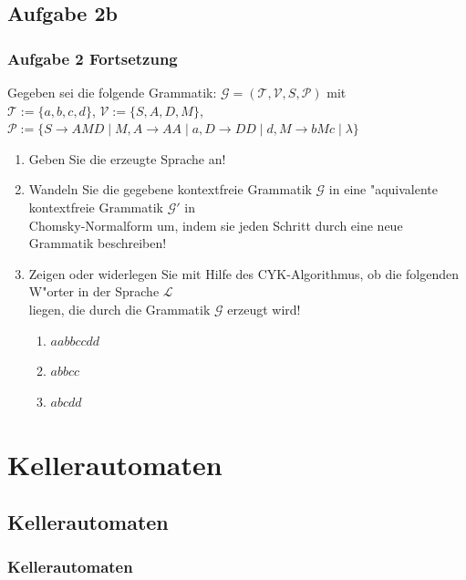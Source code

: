 \subsection{Aufgabe 2b}
\begin{frame}
	\frametitle{Aufgabe 2 Fortsetzung}
	Gegeben sei die folgende Grammatik: $\mathcal{G} = (\mathcal{T},\mathcal{V},S,
	\mathcal{P})$ mit\\
	$\mathcal{T} := \{a,b,c,d\}$, $\mathcal{V} := \{S,A,D,M\}$, $\mathcal{P} := \{
	S \rightarrow AMD \; | \; M, A \rightarrow AA \; | \; a, D \rightarrow DD \; | \; d,
	M \rightarrow bMc \; | \; \lambda\}$
	\begin{enumerate}
		\item Geben Sie die erzeugte Sprache an!
		\item Wandeln Sie die gegebene kontextfreie Grammatik $\mathcal{G}$ in eine
		"aquivalente kontextfreie Grammatik $\mathcal{G}'$ in\\
		Chomsky-Normalform um, indem sie jeden Schritt durch eine neue Grammatik beschreiben!
		\item Zeigen oder widerlegen Sie mit Hilfe des CYK-Algorithmus, ob die folgenden
		W"orter in der Sprache $\mathcal{L}$\\
		liegen, die durch die Grammatik $\mathcal{G}$ erzeugt wird!
		\begin{enumerate}
			\item $aabbccdd$
			\item $abbcc$
			\item $abcdd$
		\end{enumerate}
	\end{enumerate}
\end{frame}

\section{Kellerautomaten}
\subsection{Kellerautomaten}
\begin{frame}
	\frametitle{Kellerautomaten}
\end{frame}

